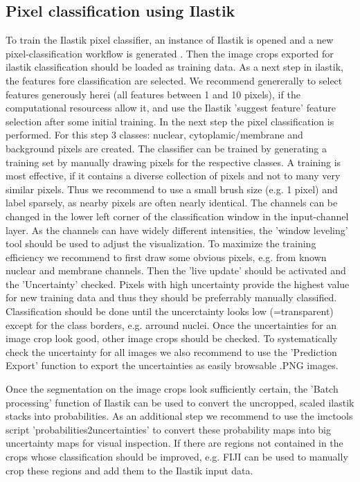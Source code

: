 \documentclass[a4paper]{article}
\begin{document}
\subsection{Pixel classification using Ilastik}
To train the Ilastik pixel classifier, an instance of Ilastik is opened and a new
pixel-classification workflow is generated \cite{sommer_ilastik:_2011}. Then the image crops exported for ilastik
classification should be loaded as training data.
As a next step in ilastik, the features fore classification are selected. We recommend genererally to select features generously
herei (all features between 1 and 10 pixels), if the computational resourcess allow it, and use the
Ilastik 'suggest feature' feature selection after some initial training.
In the next step the pixel classification is performed. For this step 3 classes: nuclear,
cytoplamic/membrane and background pixels are created.
The classifier can be trained by generating a training set by manually drawing pixels for the
respective classes. A training is most effective, if it contains a diverse collection of pixels and not to many
very similar pixels. Thus we recommend to use a small brush size (e.g. 1 pixel) and label sparsely,
as nearby pixels are often nearly identical.
The channels can be changed in the lower left corner of the
classification window in the input-channel layer. As the channels can have widely different intensities, the 'window leveling'
tool should be used to adjust the visualization.
To maximize the training efficiency we recommend to first draw some obvious pixels, e.g. from
known nuclear and membrane channels. Then the 'live update' should be activated and the
'Uncertainty' checked. Pixels with high uncertainty provide the highest value for new training data
and thus they should be preferrably manually classified. Classification should be done until the
uncerctainty looks low (=transparent) except for the class borders, e.g. arround nuclei.
Once the uncertainties for an image crop look good, other image crops should be checked.
To systematically check the uncertainty for all images we also recommend to use the 'Prediction
Export' function to export the uncertainties as easily browsable .PNG images.

Once the segmentation on the image crops look sufficiently certain, the 'Batch
processing' function of Ilastik can be used to convert the uncropped, scaled ilastik stacks into
probabilities. As an additional step we recommend to use the imctools script
'probabilities2uncertainties' to convert these probability maps into big uncertainty maps for
visual inspection. If there are regions not contained in the crops whose classification should be
improved, e.g. FIJI can be used to manually crop these regions and add them to the Ilastik input
data. 
\end{document}
